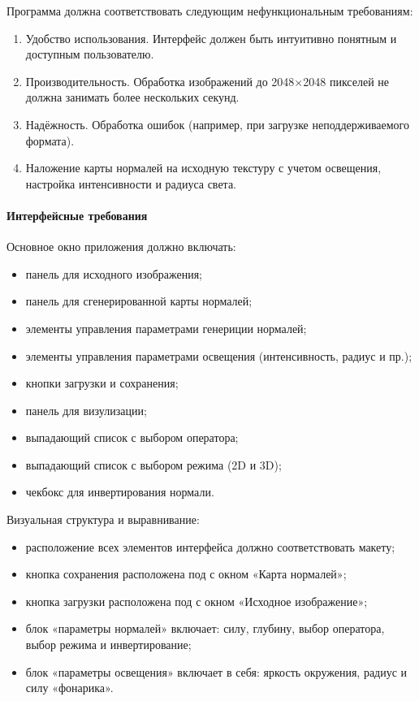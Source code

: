 Программа должна соответствовать следующим нефункциональным требованиям:
\begin{enumerate}
	\item Удобство использования. Интерфейс должен быть интуитивно понятным и доступным пользователю.
	\item Производительность. Обработка изображений до 2048×2048 пикселей не должна занимать более нескольких секунд.
	\item Надёжность. Обработка ошибок (например, при загрузке неподдерживаемого формата).
	\item Наложение карты нормалей на исходную текстуру с учетом освещения, настройка интенсивности и радиуса света.
\end{enumerate}
\paragraph{Интерфейсные требования}

Основное окно приложения должно включать:
\begin{itemize}
	\item панель для исходного изображения;
	\item панель для сгенерированной карты нормалей;
	\item элементы управления параметрами генериции нормалей;
	\item элементы управления параметрами освещения (интенсивность, радиус и пр.);
	\item кнопки загрузки и сохранения;
	\item панель для визулизации;
	\item выпадающий список с выбором оператора;
	\item выпадающий список с выбором режима (2D и 3D);
	\item чекбокс для инвертирования нормали.
\end{itemize}

Визуальная структура и выравнивание:
\begin{itemize}
	\item расположение всех элементов интерфейса должно соответствовать макету;
	\item кнопка сохранения расположена под с окном «Карта нормалей»;
	\item кнопка загрузки расположена под с окном «Исходное изображение»;
	\item блок «параметры нормалей» включает: силу, глубину, выбор оператора, выбор режима и инвертирование;
	\item блок «параметры освещения» включает в себя: яркость окружения, радиус и силу «фонарика».
\end{itemize}

